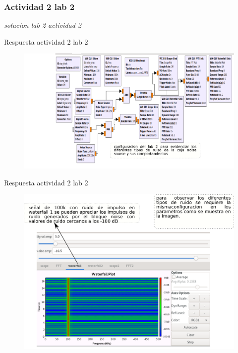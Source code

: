 \subsubsection{Actividad 2 lab 2}
\begin{frame}{}


\begin{block}{}
	\centering
	\vspace{1mm}
	\large{\textit{solucion lab 2 actividad 2}}
	\vspace{1mm}
\end{block}
\end{frame}
\begin{frame}{Respuesta actividad 2 lab 2}
\begin{figure}[H]
\centering
\includegraphics[width=\textwidth, height=0.58\textwidth]{soluciones/actividad-2-1/pdf/Rlab2_2.pdf}
\end{figure}
\end{frame}
\begin{frame}{Respuesta actividad 2 lab 2}
\begin{figure}[H]
\centering
\includegraphics[width=\textwidth, height=0.58\textwidth]{soluciones/actividad-2-1/pdf/Rlab2_3.pdf}
\end{figure}
\end{frame}

